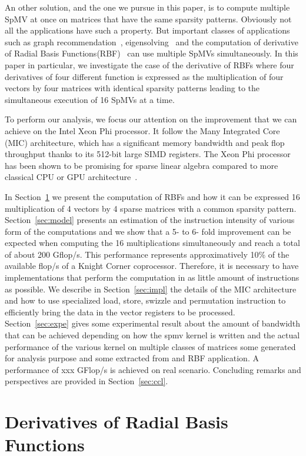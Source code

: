 \documentclass[10pt, conference, compsocconf]{IEEEtran}
\begin{document}
An other solution, and the one we pursue in this paper, is to compute
multiple SpMV at once on matrices that have the same sparsity
patterns. Obviously not all the applications have such a property. But
important classes of applications such as graph
recommendation~\cite{}, eigensolving~\cite{} and the computation of
derivative of Radial Basis Functions(RBF)~\cite{} can use multiple
SpMVs simultaneously. In this paper in particular, we investigate the
case of the derivative of RBFs where four derivatives of four
different function is expressed as the multiplication of four vectors
by four matrices with identical sparsity patterns leading to the
simultaneous execution of 16 SpMVs at a time.

To perform our analysis, we focus our attention on the improvement
that we can achieve on the Intel Xeon Phi processor. It follow the
Many Integrated Core (MIC) architecture, which has a significant
memory bandwidth and peak flop throughput thanks to its 512-bit large
SIMD registers. The Xeon Phi processor has been shown to be promising
for sparse linear algebra compared to more classical CPU or GPU
architecture~\cite{}.

In Section~\ref{sec:rbf} we present the computation of RBFs and how it
can be expressed 16 multiplication of 4 vectors by 4 sparse matrices
with a common sparsity pattern. Section~\ref{sec:model} presents an
estimation of the instruction intensity of various form of the
computations and we show that a 5- to 6- fold improvement can be
expected when computing the 16 multiplications simultaneously and
reach a total of about 200 Gflop/s. This performance represents
approximatively 10\% of the available flop/s of a Knight Corner
coprocessor. Therefore, it is necessary to have implementations that
perform the computation in as little amount of instructions as
possible. We describe in Section~\ref{sec:impl} the details of the MIC
architecture and how to use specialized load, store, swizzle and
permutation instruction to efficiently bring the data in the vector
registers to be processed. Section~\ref{sec:expe} gives some
experimental result about the amount of bandwidth that can be achieved
depending on how the spmv kernel is written and the actual performance
of the various kernel on multiple classes of matrices some generated
for analysis purpose and some extracted from and RBF application. A
performance of xxx GFlop/s is achieved on real scenario. Concluding
remarks and perspectives are provided in Section~\ref{sec:ccl}.

\section{Derivatives of Radial Basis Functions}
\label{sec:rbf}
\end{document}
